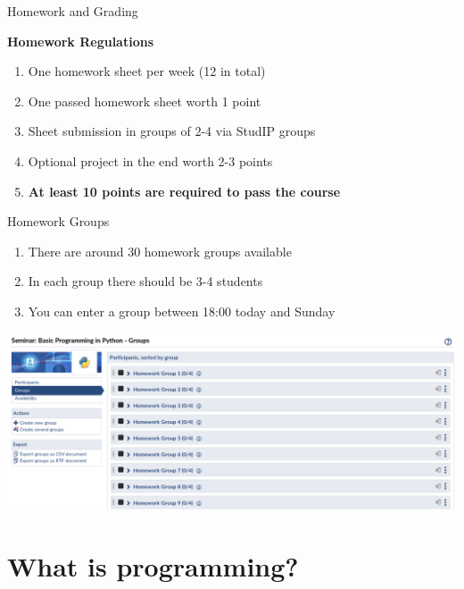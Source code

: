 \begin{frame}{Homework and Grading}

    \begin{alertblock}{\textbf{Homework Regulations}}
    \begin{enumerate}
        \item One homework sheet per week (12 in total)
        \item One passed homework sheet worth 1 point
        \item Sheet submission in groups of 2-4 via StudIP groups
        \item Optional project in the end worth 2-3 points
        \item \textbf{At least 10 points are required to pass the course}
    \end{enumerate}
    \end{alertblock}

\end{frame}

\begin{frame}{Homework Groups}

    \begin{enumerate}
        \item There are around 30 homework groups available
        \item In each group there should be 3-4 students
        \item You can enter a group between 18:00 today and Sunday
    \end{enumerate}

    \vspace{1em}

    \includegraphics[width=\textwidth]{groups.png}

\end{frame}

\section{What is programming?}

